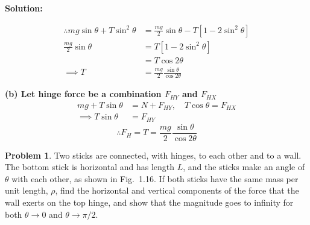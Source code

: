 \documentclass{article}
\theoremstyle{definition}
\newtheorem{problem}{Problem}
\newenvironment{solution}
  {\par\vspace{0.5em}\noindent\textbf{Solution:}\par\nopagebreak\vspace{0.3em}}
  {\par\vspace{1em}}
\begin{document}
\begin{solution}
\begin{minipage}[t]{0.62\textwidth}
        \begin{align*}
        \therefore mg \sin\theta + T \sin^2\theta &= \frac{mg}{2} \sin\theta - T \left[1 - 2\sin^2\theta\right] \\
        \frac{mg}{2} \sin\theta &= T \left[1 - 2\sin^2\theta\right] \\
        &= T \cos 2\theta \\
        \implies T &= \frac{mg}{2} \frac{\sin\theta}{\cos 2\theta}
        \end{align*}
        
        \textbf{(b) Let hinge force be a combination $F_{HY}$ and $F_{HX}$}
        \begin{align*}
        mg + T \sin\theta &= N + F_{HY}, \quad T \cos\theta = F_{HX} \\
        \implies T \sin\theta &= F_{HY}
        \end{align*}
        \[
        \therefore F_H = T = \frac{mg}{2} \frac{\sin\theta}{\cos 2\theta}
        \]
    \end{minipage}
\end{solution}
\begin{problem}
    Two sticks are connected, with hinges, to each other and to a wall. The bottom stick is horizontal and has length $L$, and the sticks make an angle of $\theta$ with each other, as shown in Fig.~1.16. If both sticks have the same mass per unit length, $\rho$, find the horizontal and vertical components of the force that the wall exerts on the top hinge, and show that the magnitude goes to infinity for both $\theta \to 0$ and $\theta \to \pi/2$.
\end{problem}
\end{document}
